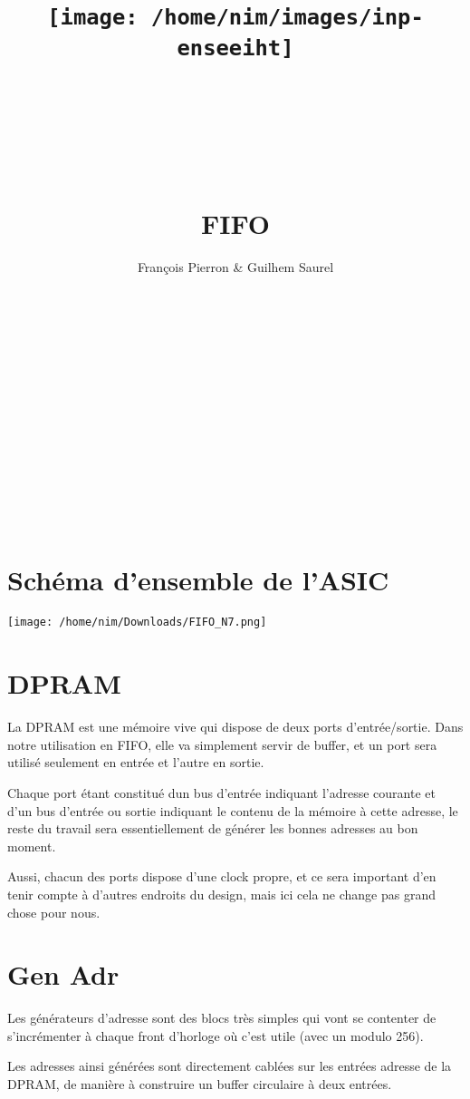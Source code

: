 \documentclass{article}
\title{\texttt{[image: /home/nim/images/inp-enseeiht]} \\ ~ \\ ~ \\ ~ \\ ~ \\ FIFO}
\author{François Pierron \& Guilhem Saurel}
\date{\oldstylenums{\today}}
\begin{document}
\begin{titlepage}
    \maketitle

    ~

    ~

    ~

    ~

    ~

    ~

    ~

    \tableofcontents
\end{titlepage}


\section{Schéma d’ensemble de l’ASIC}

\texttt{[image: /home/nim/Downloads/FIFO\_N7.png]}

\section{DPRAM}

La DPRAM est une mémoire vive qui dispose de deux ports d’entrée/sortie. Dans notre utilisation en FIFO, elle va simplement servir de buffer, et un port sera utilisé seulement en entrée et l’autre en sortie.

Chaque port étant constitué dun bus d’entrée indiquant l’adresse courante et d’un bus d’entrée ou sortie indiquant le contenu de la mémoire à cette adresse, le reste du travail sera essentiellement de générer les bonnes adresses au bon moment.

Aussi, chacun des ports dispose d’une clock propre, et ce sera important d’en tenir compte à d’autres endroits du design, mais ici cela ne change pas grand chose pour nous.

\section{Gen Adr}

Les générateurs d’adresse sont des blocs très simples qui vont se contenter de s’incrémenter à chaque front d’horloge où c’est utile (avec un modulo 256).

Les adresses ainsi générées sont directement cablées sur les entrées adresse de la DPRAM, de manière à construire un buffer circulaire à deux entrées.
\end{document}
